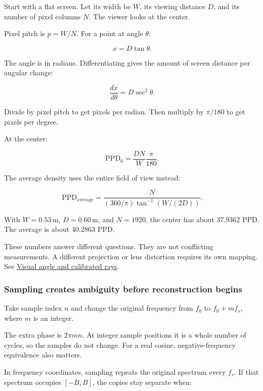 \hypertarget{04-visual-computing-ii-ch043-why-local-pixels-per-degree-is-not-the-average}{}

Start with a flat screen. Let its width be \(W\), its viewing distance \(D\), and its number of pixel columns \(N\). The viewer looks at the center.

Pixel pitch is \(p=W/N\). For a point at angle \(\theta\):

\[
x=D\tan\theta.
\]

The angle is in radians. Differentiating gives the amount of screen distance per angular change:

\[
\frac{dx}{d\theta}=D\sec^2\theta.
\]

Divide by pixel pitch to get pixels per radian. Then multiply by \(\pi/180\) to get pixels per degree.

At the center:

\[
\mathrm{PPD}_0=\frac{DN}{W}\frac{\pi}{180}.
\]

The average density uses the entire field of view instead:

\[
\mathrm{PPD}_{\mathrm{average}}
=\frac{N}{(360/\pi)\tan^{-1}(W/(2D))}.
\]

With \(W=0.53\,\mathrm{m}\), \(D=0.60\,\mathrm{m}\), and \(N=1920\), the center has about 37.9362 PPD. The average is about 40.2863 PPD.

These numbers answer different questions. They are not conflicting measurements. A different projection or lens distortion requires its own mapping. See \hyperref[appendix-7d356c396d1a]{Visual angle and calibrated rays}.

\subsubsection{Sampling creates ambiguity before reconstruction begins}\label{04-visual-computing-ii-ch043-sampling-creates-ambiguity-before-reconstruction-begins}

\hypertarget{04-visual-computing-ii-ch043-sampling-creates-ambiguity-before-reconstruction-begins}{}

Take sample index \(n\) and change the original frequency from \(f_0\) to \(f_0+mf_s\), where \(m\) is an integer.

The extra phase is \(2\pi mn\). At integer sample positions it is a whole number of cycles, so the samples do not change. For a real cosine, negative-frequency equivalence also matters.

In frequency coordinates, sampling repeats the original spectrum every \(f_s\). If that spectrum occupies \([-B,B]\), the copies stay separate when:

